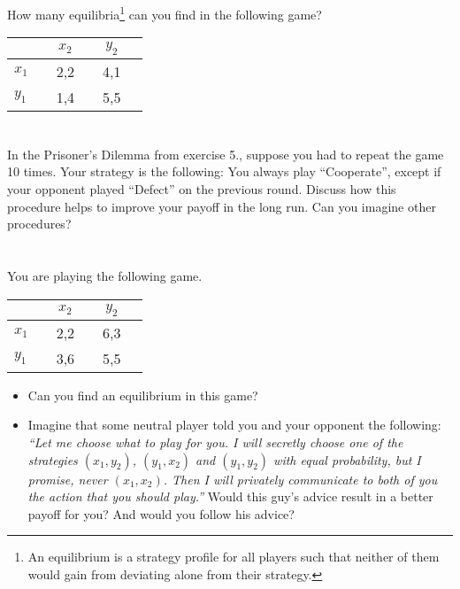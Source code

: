 \documentclass{../ape}
\begin{document}
\begin{solution}

\end{solution}

\section{}
How many equilibria\footnote{An equilibrium is a strategy profile for all players such that neither of them would gain from deviating alone from their strategy.} can you find in the following game?
\begin{center}
\begin{tabular}[h!]{l|ccccc}
	&& \Large{$x_2$} && \Large{$y_2$} & \\
	\hline
	\Large{$x_1$} && \Large{2,2} && \Large{4,1} & \\
	\Large{$y_1$} && \Large{1,4} && \Large{5,5} &
\end{tabular}
\end{center}

\begin{solution}

\end{solution}

\section{}
In the Prisoner's Dilemma from exercise 5., suppose you had to repeat the game 10 times. Your strategy is the following: You always play ``Cooperate'', except if your opponent played ``Defect'' on the previous round. Discuss how this procedure helps to improve your payoff in the long run. Can you imagine other procedures?

\nosolution

\section{}
You are playing the following game.

\begin{center}
\begin{tabular}[h!]{l|ccccc}
	&& \Large{$x_2$} && \Large{$y_2$} & \\
	\hline
	\Large{$x_1$} && \Large{2,2} && \Large{6,3} & \\
	\Large{$y_1$} && \Large{3,6} && \Large{5,5} &
\end{tabular}
\end{center}

\begin{itemize}
\item Can you find an equilibrium in this game?
\item Imagine that some neutral player told you and your opponent the following: \emph{``Let me choose what to play for you. I will secretly choose one of the strategies $(x_1, y_2)$, $(y_1, x_2)$ and $(y_1, y_2)$ with equal probability, but I promise,  never $(x_1, x_2)$. Then I will privately communicate to both of you the action that you should play.''} Would this guy's advice result in a better payoff for you? And would you follow his advice?
\end{itemize}
\end{document}
